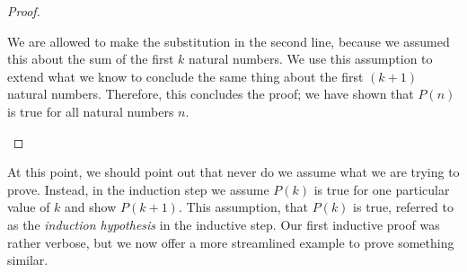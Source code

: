 \begin{proof}
\begin{enumerate}
		We are allowed to make the substitution in the second line, because we assumed this about the sum of the first $k$ natural numbers. We use this assumption to extend what we know to conclude the same thing about the first $(k + 1)$ natural numbers. Therefore, this concludes the proof; we have shown that $P(n)$ is true for all natural numbers $n$.
	\end{enumerate}
\end{proof}
\vspace{\baselineskip}

At this point, we should point out that never do we assume what we are trying to prove. Instead, in the induction step we assume $P(k)$ is true for one particular value of $k$ and show $P(k + 1)$. This assumption, that $P(k)$ is true, referred to as the \emph{induction hypothesis} in the inductive step. Our first inductive proof was rather verbose, but we now offer a more streamlined example to prove something similar.


